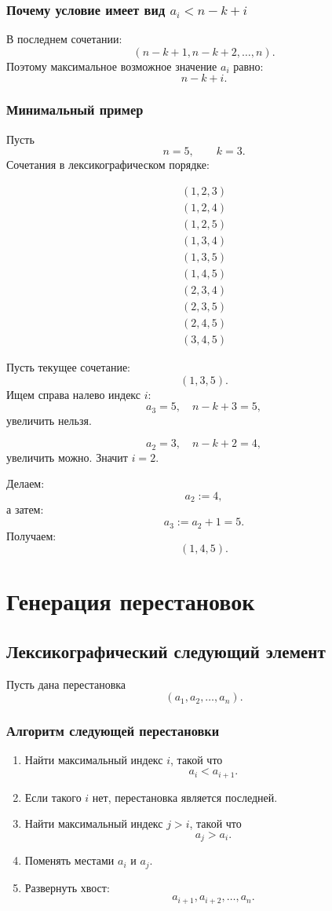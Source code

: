 \documentclass[12pt,a4paper]{article}
\begin{document}
\subsubsection*{Почему условие имеет вид $a_i<n-k+i$}

В последнем сочетании:
\[
(n-k+1,n-k+2,\dots,n).
\]
Поэтому максимальное возможное значение $a_i$ равно:
\[
n-k+i.
\]

\subsubsection*{Минимальный пример}

Пусть
\[
n=5,\qquad k=3.
\]
Сочетания в лексикографическом порядке:

\[
\begin{array}{c}
(1,2,3)\\
(1,2,4)\\
(1,2,5)\\
(1,3,4)\\
(1,3,5)\\
(1,4,5)\\
(2,3,4)\\
(2,3,5)\\
(2,4,5)\\
(3,4,5)
\end{array}
\]

Пусть текущее сочетание:
\[
(1,3,5).
\]
Ищем справа налево индекс $i$:
\[
a_3=5,\quad n-k+3=5,
\]
увеличить нельзя.

\[
a_2=3,\quad n-k+2=4,
\]
увеличить можно. Значит $i=2$.

Делаем:
\[
a_2:=4,
\]
а затем:
\[
a_3:=a_2+1=5.
\]
Получаем:
\[
(1,4,5).
\]

\section{Генерация перестановок}

\subsection{Лексикографический следующий элемент}

Пусть дана перестановка
\[
(a_1,a_2,\dots,a_n).
\]

\subsubsection*{Алгоритм следующей перестановки}

\begin{enumerate}
    \item Найти максимальный индекс $i$, такой что
    \[
    a_i<a_{i+1}.
    \]
    \item Если такого $i$ нет, перестановка является последней.
    \item Найти максимальный индекс $j>i$, такой что
    \[
    a_j>a_i.
    \]
    \item Поменять местами $a_i$ и $a_j$.
    \item Развернуть хвост:
    \[
    a_{i+1},a_{i+2},\dots,a_n.
    \]
\end{enumerate}
\end{document}
